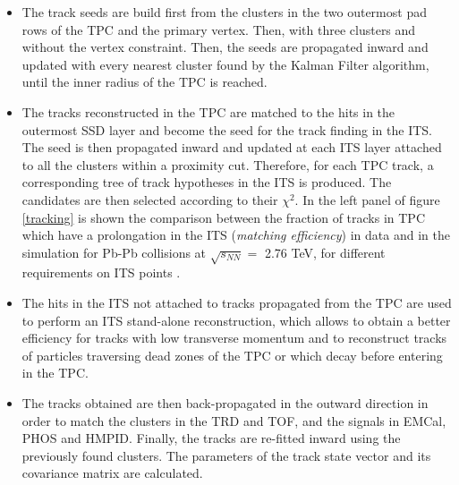 \documentclass[b5paper,10pt,twoside,oldstyle,classica]{toptesi}
\begin{document}
\begin{itemize}
 \item The track seeds are build first from the clusters in the two outermost pad rows of the TPC and the primary vertex. Then, with three clusters and without the vertex constraint. Then, the seeds are propagated inward and updated with every nearest cluster found by the Kalman Filter algorithm, until the inner radius of the TPC is reached.
 \item The tracks reconstructed in the TPC are matched to the hits in the outermost SSD layer and become the seed for the track finding in the ITS. The seed is then propagated inward and updated at each ITS layer attached to all the clusters within a proximity cut. Therefore, for each TPC track, a corresponding tree of track hypotheses in the ITS is produced. The candidates are then selected according to their $\chi^2$. In the left panel of figure \ref{tracking} is shown the comparison between the fraction of tracks in TPC which have a prolongation in the ITS (\textit{matching efficiency}) in data and in the simulation for Pb-Pb collisions at $\sqrt{s_{NN}} =$ 2.76 TeV, for different requirements on ITS points \cite{Abelev:2014ffa}. 
 \item The hits in the ITS not attached to tracks propagated from the TPC are used to perform an ITS stand-alone reconstruction, which allows to obtain a better efficiency for tracks with low transverse momentum and to reconstruct tracks of particles traversing dead zones of the TPC or which decay before entering in the TPC. 
 \item The tracks obtained are then back-propagated in the outward direction in order to match the clusters in the TRD and TOF, and the signals in EMCal, PHOS and HMPID. Finally, the tracks are re-fitted inward using the previously found clusters. The parameters of the track state vector and its covariance matrix are calculated. 
\end{itemize}
\end{document}
